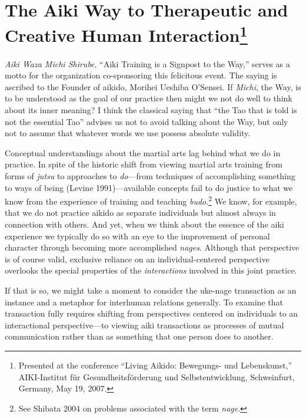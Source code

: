 \chapter[The Aiki Way to Therapeutic Creative Human Interaction (2007)]{The Aiki Way to Therapeutic and Creative Human Interaction\footnote{Presented at the conference ``Living Aikido: Bewegungs- und Lebenskunst,'' AIKI-Institut f\"{u}r Gesundheitsf\"{o}rderung und Selbstentwicklung, Schweinfurt, Germany, May 19, 2007.}}

\renewcommand{\longleftarrow}{\xleftarrow{\hspace*{8em}}}
\renewcommand{\longrightarrow}{\xrightarrow{\hspace*{8em}}}

\emph{Aiki Waza Michi Shirube}, ``Aiki Training is a Signpost to the Way,'' serves as a motto for the organization co-sponsoring this felicitous event. The saying is ascribed to the Founder of aikido, Morihei Ueshiba O'Sensei. If \emph{Michi}, the Way, is to be understood as the goal of our practice then might we not do well to think about its inner meaning? I think the classical saying that ``the Tao that is told is not the essential Tao'' advises us not to avoid talking about the Way, but only not to assume that whatever words we use possess absolute validity.

Conceptual understandings about the martial arts lag behind what we do in practice. In spite of the historic shift from viewing martial arts training from forms of \emph{jutsu} to approaches to \emph{do}---from techniques of accomplishing something to ways of being (Levine 1991)---available concepts fail to do justice to what we know from the experience of training and teaching \emph{budo}.\footnote{See Shibata 2004 on problems associated with the term \emph{nage}.} We know, for example, that we do not practice aikido as separate individuals but almost always in connection with others. And yet, when we think about the essence of the aiki experience we typically do so with an eye to the improvement of personal character through becoming more accomplished \emph{nages}. Although that perspective is of course valid, exclusive reliance on an individual-centered perspective overlooks the special properties of the \emph{interactions} involved in this joint practice. 

If that is so, we might take a moment to consider the uke-nage transaction as an instance and a metaphor for interhuman relations generally. To examine that transaction fully requires shifting from perspectives centered on individuals to an interactional perspective---to viewing aiki transactions as processes of mutual communication rather than as something that one person does to another. 

